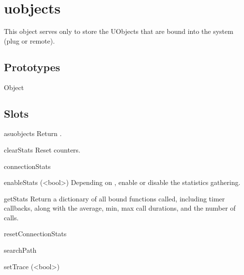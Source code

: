 
\section{uobjects}

This object serves only to store the UObjects that are bound into the system
(plug or remote).

\subsection{Prototypes}
\begin{refObjects}
\item[Object]
\end{refObjects}

\subsection{Slots}

\begin{urbiscriptapi}
\item[asuobjects]%
  Return \this.

\item[clearStats]%
  Reset counters.

\item[connectionStats]%

\item[enableStats](<bool>)%
  Depending on , enable or disable the statistics gathering.

\item[getStats]%
  Return a dictionary of all bound \Cxx functions called, including timer
  callbacks, along with the average, min, max call durations, and the number
  of calls.

\item[resetConnectionStats]%

\item[searchPath]%

\item[setTrace](<bool>)%

\end{urbiscriptapi}

